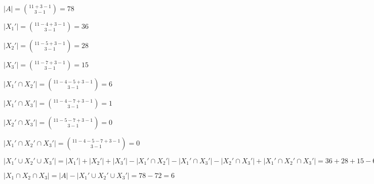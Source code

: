 \begin{problem}
{        \begin{center}
        $ |A| = \binom{11+3-1}{3-1} = 78 $
    
        $ |X_1'| = \binom{11-4+3-1}{3-1} = 36 $
        
        $ |X_2'| = \binom{11-5+3-1}{3-1} = 28 $
    
        $ |X_3'| = \binom{11-7+3-1}{3-1} = 15 $
    
        $ |X_1' \cap X_2'| = \binom{11-4-5+3-1}{3-1} = 6 $
    
        $ |X_1' \cap X_3'| = \binom{11-4-7+3-1}{3-1} = 1 $
    
        $ |X_2' \cap X_3'| = \binom{11-5-7+3-1}{3-1} = 0 $
    
        $ |X_1' \cap X_2' \cap X_3'| = \binom{11-4-5-7+3-1}{3-1} = 0 $
    
        $ |X_1' \cup X_2' \cup X_3'| = |X_1'| + |X_2'| + |X_3'| - |X_1' \cap X_2'| - |X_1' \cap X_3'| - |X_2' \cap X_3'| + |X_1' \cap X_2' \cap X_3'| 
        = 36 + 28 + 15 - 6 - 1 - 0 + 0 = 72 $
    
        $ |X_1 \cap X_2 \cap X_3| = |A| - |X_1' \cup X_2' \cup X_3'| = 78 - 72 = 6 $
        \end{center}
    }
  
\end{problem}
